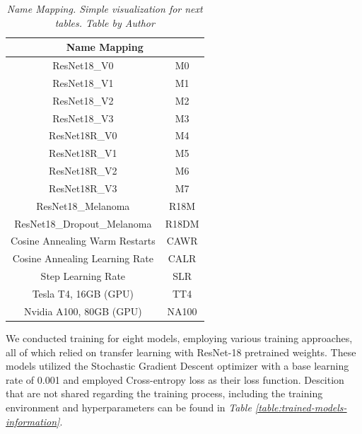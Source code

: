 \begin{table}[H]
  \centering
  \begin{tabular}{cc}
    \toprule

    \multicolumn{2}{c}{\textbf{Name Mapping}} \\
    \midrule
    ResNet18\_V0 & M0 \\
    ResNet18\_V1 & M1 \\
    ResNet18\_V2 & M2 \\
    ResNet18\_V3 & M3 \\
    ResNet18R\_V0  & M4 \\
    ResNet18R\_V1  & M5 \\
    ResNet18R\_V2 & M6 \\
    ResNet18R\_V3  & M7 \\
    ResNet18\_Melanoma & R18M \\
    ResNet18\_Dropout\_Melanoma & R18DM \\
    Cosine Annealing Warm Restarts & CAWR \\
    Cosine Annealing Learning Rate & CALR \\
    Step Learning Rate & SLR \\
    Tesla T4, 16GB (GPU) & TT4 \\
    Nvidia A100, 80GB (GPU) & NA100 \\
    \bottomrule
  \end{tabular}
  \caption[Name Mapping]
  {\textit{Name Mapping. Simple visualization for next tables.
  Table by Author}}
  {\label{table:mapping-names}}
\end{table}

We conducted training for eight models, employing various training approaches,
all of which relied on transfer learning with ResNet-18 pretrained weights.
These models utilized the Stochastic Gradient Descent optimizer with a base
learning rate of 0.001 and employed Cross-entropy loss as their loss function.
Descition that are not shared regarding the training process, including the
training environment and hyperparameters can be found in
\textit{Table \ref{table:trained-models-information}}.

\newpage

